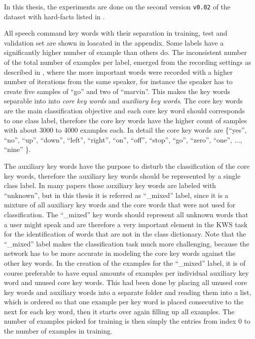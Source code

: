 In this thesis, the experiments are done on the second version \texttt{v0.02} of the dataset with hard-facts listed in .

All speech command key words with their separation in training, test and validation set are shown in  loacated in the appendix.
%
Some labels have a significantly higher number of example than others do.
The inconsistent number of the total number of examples per label, emerged from the recording settings as described in \cite{Warden2018}, where the more important words were recorded with a higher number of iterations from the same speaker, for instance the speaker has to create five samples of \enquote{go} and two of \enquote{marvin}.
This makes the key words separable into into \emph{core key words} and \emph{auxiliary key words}.
The core key words are the main classification objective and each core key word should corresponds to one class label, therefore the core key words have the higher count of samples with about 3000 to 4000 examples each.
In detail the core key words are \{\enquote{yes}, \enquote{no}, \enquote{up}, \enquote{down}, \enquote{left}, \enquote{right}, \enquote{on}, \enquote{off}, \enquote{stop}, \enquote{go}, \enquote{zero}, \enquote{one}, ..., \enquote{nine} \}.

The auxiliary key words have the purpose to disturb the classification of the core key words, therefore the auxiliary key words should be represented by a single class label.
In many papers those auxiliary key words are labeled with \enquote{unknown}, but in this thesis it is referred as \enquote{\_mixed} label, since it is a mixture of all auxiliary key words and the core words that were not used for classification.
The \enquote{\_mixed} key words should represent all unknown words that a user might speak and are therefore a very important element in the KWS task for the identification of words that are not in the class dictionary.
Note that the \enquote{\_mixed} label makes the classification task much more challenging, because the network has to be more accurate in modeling the core key words against the other key words.
In the creation of the examples for the \enquote{\_mixed} label, it is of course preferable to have equal amounts of examples per individual auxiliary key word and unused core key words.
This had been done by placing all unused core key words and auxiliary words into a separate folder and reading them into a list, which is ordered so that one example per key word is placed consecutive to the next for each key word, then it starts over again filling up all examples.
The number of examples picked for training is then simply the entries from index 0 to the number of examples in training. 

